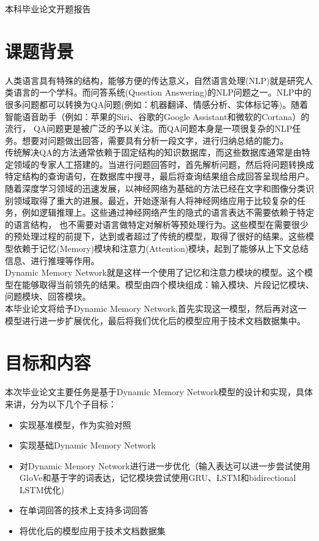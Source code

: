 \setcounter{page}{1}
{\sanhao\heiti\filcenter \centerline{本科毕业论文开题报告}}
\section{课题背景}

人类语言具有特殊的结构，能够方便的传达意义，自然语言处理(NLP)就是研究人类语言的一个学科。而问答系统(Question Answering)的NLP问题之一。NLP中的很多问题都可以转换为QA问题(例如：机器翻译、情感分析、实体标记等)。随着智能语音助手（例如：苹果的Siri、谷歌的Google Assistant和微软的Cortana）的流行，
QA问题更是被广泛的予以关注。而QA问题本身是一项很复杂的NLP任务。想要对问题做出回答，需要具有分析一段文字，进行归纳总结的能力。\\
传统解决QA的方法通常依赖于固定结构的知识数据库，而这些数据库通常是由特定领域的专家人工搭建的。当进行问题回答时，首先解析问题，然后将问题转换成特定结构的查询语句，在数据库中搜寻，最后将查询结果组合成回答呈现给用户。\\
随着深度学习领域的迅速发展，以神经网络为基础的方法已经在文字和图像分类识别领域取得了重大的进展。最近，开始逐渐有人将神经网络应用于比较复杂的任务，例如逻辑推理上。这些通过神经网络产生的隐式的语言表达不需要依赖于特定的语言结构，
也不需要对语言做特定对解析等预处理行为。这些模型在需要很少的预处理过程的前提下，达到或者超过了传统的模型，取得了很好的结果。这些模型依赖于记忆(Memory)模块和注意力(Attention)模块，起到了能够从上下文总结信息、进行推理等作用。\\
Dynamic Memory Network就是这样一个使用了记忆和注意力模块的模型。这个模型在能够取得当前领先的结果。模型由四个模块组成：输入模块、片段记忆模块、问题模块、回答模块。\\
本毕业论文将给予Dynamic Memory Network,首先实现这一模型，然后再对这一模型进行进一步扩展优化，最后将我们优化后的模型应用于技术文档数据集中。\\
\section{目标和内容}
本次毕业论文主要任务是基于Dynamic Memory Network模型的设计和实现，具体来讲，分为以下几个子目标：
\begin{itemize}
\item 实现基准模型，作为实验对照
\item 实现基础Dynamic Memory Network
\item 对Dynamic Memory Network进行进一步优化（输入表达可以进一步尝试使用GloVe和基于字的词表达，记忆模块尝试使用GRU、LSTM和bidirectional LSTM优化)
\item 在单词回答的技术上支持多词回答
\item 将优化后的模型应用于技术文档数据集
\end{itemize} 
